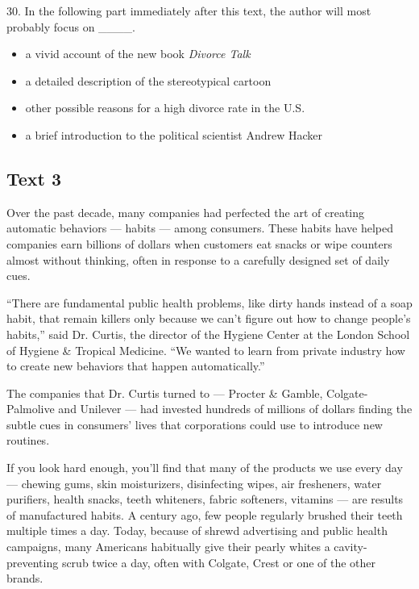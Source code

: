 \documentclass[UTF8,11pt]{ctexart}
\begin{document}
30. In the following part immediately after this text, the author will most probably focus on \_\_\_\_.


\begin{itemize}[leftmargin=2em,itemsep=.2em,topsep=.4em]\item[A.] a vivid account of the new book \textit{Divorce Talk}
\item[B.] a detailed description of the stereotypical cartoon
\item[C.] other possible reasons for a high divorce rate in the U.S.
\item[D.] a brief introduction to the political scientist Andrew Hacker
\end{itemize}

\subsection*{\textbf{Text 3}}


Over the past decade, many companies had perfected the art of creating automatic behaviors — habits — among consumers. These habits have helped companies earn billions of dollars when customers eat snacks or wipe counters almost without thinking, often in response to a carefully designed set of daily cues.


“There are fundamental public health problems, like dirty hands instead of a soap habit, that remain killers only because we can’t figure out how to change people’s habits,” said Dr. Curtis, the director of the Hygiene Center at the London School of Hygiene \& Tropical Medicine. “We wanted to learn from private industry how to create new behaviors that happen automatically.”


The companies that Dr. Curtis turned to — Procter \& Gamble, Colgate-Palmolive and Unilever — had invested hundreds of millions of dollars finding the subtle cues in consumers’ lives that corporations could use to introduce new routines.


If you look hard enough, you’ll find that many of the products we use every day — chewing gums, skin moisturizers, disinfecting wipes, air fresheners, water purifiers, health snacks, teeth whiteners, fabric softeners, vitamins — are results of manufactured habits. A century ago, few people regularly brushed their teeth multiple times a day. Today, because of shrewd advertising and public health campaigns, many Americans habitually give their pearly whites a cavity-preventing scrub twice a day, often with Colgate, Crest or one of the other brands.
\end{document}
